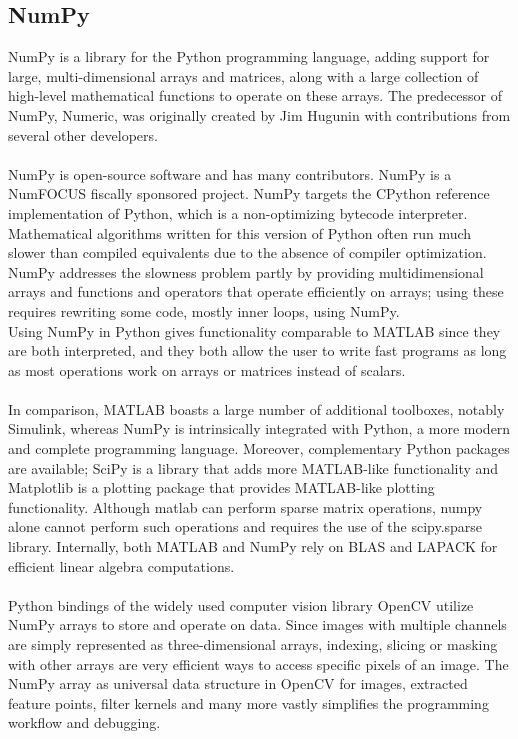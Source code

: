 \subsection{\textbf{NumPy}}
\cite{NumPy}
NumPy is a library for the Python programming language, adding support for large, multi-dimensional arrays and matrices, along with a large collection of high-level mathematical functions to operate on these arrays. The predecessor of NumPy, Numeric, was originally created by Jim Hugunin with contributions from several other developers.\\
 
\\ NumPy is open-source software and has many contributors. NumPy is a NumFOCUS fiscally sponsored project.
NumPy targets the CPython reference implementation of Python, which is a non-optimizing bytecode interpreter. Mathematical algorithms written for this version of Python often run much slower than compiled equivalents due to the absence of compiler optimization. NumPy addresses the slowness problem partly by providing multidimensional arrays and functions and operators that operate efficiently on arrays; using these requires rewriting some code, mostly inner loops, using NumPy.\\

Using NumPy in Python gives functionality comparable to MATLAB since they are both interpreted, and they both allow the user to write fast programs as long as most operations work on arrays or matrices instead of scalars.\\

\\In comparison, MATLAB boasts a large number of additional toolboxes, notably Simulink, whereas NumPy is intrinsically integrated with Python, a more modern and complete programming language. Moreover, complementary Python packages are available; SciPy is a library that adds more MATLAB-like functionality and Matplotlib is a plotting package that provides MATLAB-like plotting functionality. Although matlab can perform sparse matrix operations, numpy alone cannot perform such operations and requires the use of the scipy.sparse library. Internally, both MATLAB and NumPy rely on BLAS and LAPACK for efficient linear algebra computations.\\

\\Python bindings of the widely used computer vision library OpenCV utilize NumPy arrays to store and operate on data. Since images with multiple channels are simply represented as three-dimensional arrays, indexing, slicing or masking with other arrays are very efficient ways to access specific pixels of an image. The NumPy array as universal data structure in OpenCV for images, extracted feature points, filter kernels and many more vastly simplifies the programming workflow and debugging.\\


